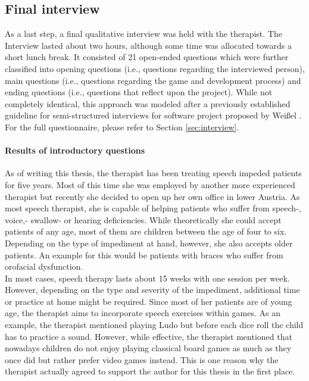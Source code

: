 \documentclass[draft,final]{vutinfth} %
\begin{document}
\subsection{Final interview}
As a last step, a final qualitative interview was held with the therapist. The Interview lasted about two hours, although some time was allocated towards a short lunch break. It consisted of 21 open-ended questions which were further classified  into opening questions (i.e., questions regarding the interviewed person),  main questions (i.e., questions regarding the game and development process) and ending questions (i.e., questions that reflect upon the project). While not completely identical, this approach was modeled after a previously established guideline for semi-structured interviews for software project proposed by Weißel \cite{wessel2010semi}. For the full questionnaire, please refer to Section \ref{sec:interview}.

\paragraph{Results of introductory questions} 
As of writing this thesis, the therapist has been treating speech impeded patients for five years. Most of this time she was employed by another more experienced therapist but recently she decided to open up her own office in lower Austria. As most speech therapist, she is capable of helping patients who suffer from speech-, voice,- swallow- or hearing deficiencies. While theoretically she could accept patients of any age, most of them are children between the age of four to six. Depending on the type of impediment at hand, however, she also accepts older patients. An example for this would be patients with braces who suffer from orofacial dysfunction. \\
In most cases, speech therapy lasts about 15 weeks with one session per week. However, depending on the type and severity of the impediment, additional time or practice at home might be required. Since most of her patients are of young age, the therapist aims to incorporate speech exercises within games. As an example, the therapist mentioned playing Ludo but before each dice roll the child has to practice a sound. However, while effective, the therapist mentioned that nowadays children do not enjoy playing classical board games as much as they once did but rather prefer video games instead. This is one reason why the therapist actually agreed to support the author for this thesis in the first place.
\end{document}
